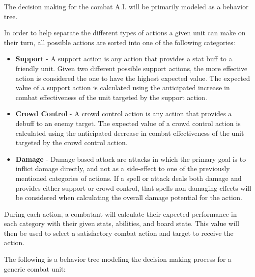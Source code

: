 \documentclass[12pt,a4paper]{report}
\begin{document}
		The decision making for the combat A.I. will be primarily modeled as a behavior tree. 
		
		In order to help separate the different types of actions a given unit can make on their turn, all possible actions are sorted into one of the following categories:
		
		\begin{itemize}
			\item \textbf{Support} - A support action is any action that provides a stat buff to a friendly unit. Given two different possible support actions, the more effective action is considered the one to have the highest expected value. The expected value of a support action is calculated using the anticipated increase in combat effectiveness of the unit targeted by the support action. 
			\item \textbf{Crowd Control} - A crowd control action is any action that provides a debuff to an enemy target. The expected value of a crowd control action is calculated using the anticipated decrease in combat effectiveness of the unit targeted by the crowd control action.
			\item \textbf{Damage} - Damage based attack are attacks in which the primary goal is to inflict damage directly, and not as a side-effect to one of the previously mentioned categories of actions. If a spell or attack deals both damage and provides either support or crowd control, that spells non-damaging effects will be considered when calculating the overall damage potential for the action. 
		\end{itemize}
		
		During each action, a combatant will calculate their expected performance in each category with their given stats, abilities, and board state. This value will then be used to select a satisfactory combat action and target to receive the action.
		
		The following is a behavior tree modeling the decision making process for a generic combat unit:
		
\end{document}
